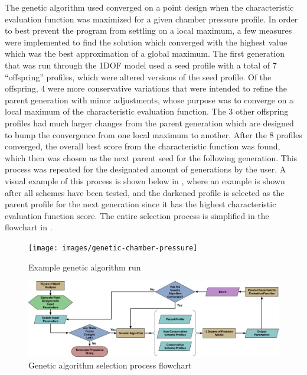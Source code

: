 The genetic algorithm used converged on a point design when the characteristic evaluation function was maximized for a given chamber pressure profile. In order to best prevent the program from settling on a local maximum, a few measures were implemented to find the solution which converged with the highest value which was the best approximation of a global maximum. The first generation that was run through the 1DOF model used a seed profile with a total of 7 ``offspring'' profiles, which were altered versions of the seed profile. Of the offspring, 4 were more conservative variations that were intended to refine the parent generation with minor adjustments, whose purpose was to converge on a local maximum of the characteristic evaluation function. The 3 other offspring profiles had much larger changes from the parent generation which are designed to bump the convergence from one local maximum to another. After the 8 profiles converged, the overall best score from the characteristic function was found, which then was chosen as the next parent seed for the following generation. This process was repeated for the designated amount of generations by the user. A visual example of this process is shown below in , where an example is shown after all schemes have been tested, and the darkened profile is selected as the parent profile for the next generation since it has the highest characteristic evaluation function score. The entire selection process is simplified in the flowchart in .

\begin{figure}
    \centering
    \texttt{[image: images/genetic-chamber-pressure]}
    \caption{Example genetic algorithm run}
    \label{figure:genetic-chamber-pressure}
\end{figure}


\begin{figure}
    \centering
    \includegraphics[width=\linewidth]{images/genetic-flowchart}
    \caption{Genetic algorithm selection process flowchart}
    \label{figure:genetic-flowchart}
\end{figure}

